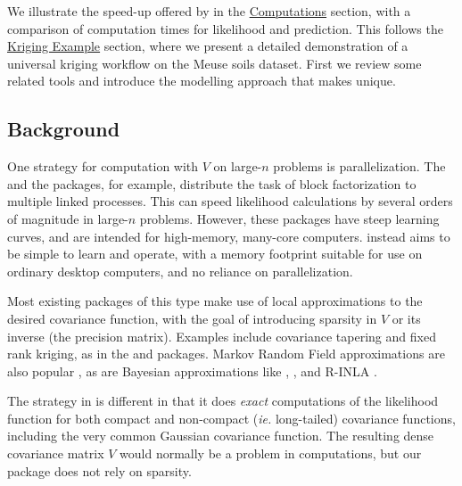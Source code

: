 We illustrate the speed-up offered by  in the \protect\hyperlink{computations}{Computations} section, with a comparison of computation times for likelihood and prediction. This follows the \protect\hyperlink{kriging-example}{Kriging Example} section, where we present a detailed demonstration of a universal kriging workflow on the Meuse soils dataset. First we review some related tools and introduce the modelling approach that makes  unique.

\hypertarget{background}{%
\subsection{Background}\label{background}}

One strategy for computation with \(V\) on large-\(n\) problems is parallelization. The  \citep{paciorek2015biggp} and the  \citep{gramacy2016lagp} packages, for example, distribute the task of block factorization to multiple linked processes. This can speed likelihood calculations by several orders of magnitude in large-\(n\) problems. However, these packages have steep learning curves, and are intended for high-memory, many-core computers.  instead aims to be simple to learn and operate, with a memory footprint suitable for use on ordinary desktop computers, and no reliance on parallelization.

Most existing packages of this type make use of local approximations to the desired covariance function, with the goal of introducing sparsity in \(V\) or its inverse (the precision matrix). Examples include covariance tapering and fixed rank kriging, as in the  \citep{nychka2016latticekrig} and  \citep{zammit2021frk} packages. Markov Random Field approximations \citep{lindgren2011explicit} are also popular \citep[despite the interpretability drawbacks discussed by][]{wall2004close}, as are Bayesian approximations like  \citep{finley2007spbayes, finley2015spbayes},  \citep{gramacy2016lagp}, and R-INLA \citep{lindgren2015bayesian}.

The strategy in  is different in that it does \emph{exact} computations of the likelihood function for both compact and non-compact (\emph{ie.} long-tailed) covariance functions, including the very common Gaussian covariance function. The resulting dense covariance matrix \(V\) would normally be a problem in computations, but our package does not rely on sparsity.

